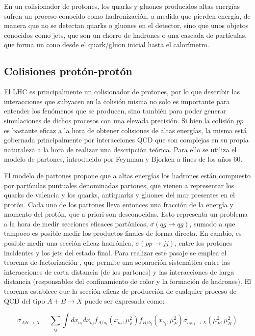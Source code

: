 En un colisionador de protones, los quarks y
gluones producidos altas energías sufren un proceso conocido como hadronización,
a medida que pierden energía, de manera que no se detectan quarks o gluones en el
detector, sino que unos objetos conocidos como jets, que son un chorro de hadrones
o una cascada de partículas, que forma un cono desde el quark/gluon inicial hasta el
calorímetro. 



\subsection{Colisiones protón-protón}

El LHC es principalmente un colisionador de protones, por lo que describir las interacciones que subyacen en la colisión misma no solo es importante para entender los fenómenos que se producen, sino también para poder generar simulaciones de dichos procesos con una elevada precisión. Si bien la colisión $pp$ es bastante eficaz a la hora de obtener colisiones de altas energías, la misma está gobernada principalmente por interacciones QCD que son complejas en su propia naturaleza a la hora de realizar una descripción teórica. Para ello se utiliza el modelo de partones, introducido por Feynman \cite{feynman} y Bjorken \cite{bjorken} a fines de los años 60. 

El modelo de partones propone que a altas energías los hadrones están compuesto por partículas puntuales denominadas partones, que vienen a representar los quarks de valencia y los quarks, antiquarks y gluones del mar presentes en el protón. Cada uno de los partones lleva entonces una fracción de la energía y momento del protón, que a priori son desconocidas. Esto representa un problema a la hora de medir secciones eficaces partónicas, $\sigma(qg\to qg)$, sumado a que tampoco es posible medir los productos finales de forma directa. En cambio, es posible medir una sección eficaz hadrónica, $\sigma(pp\to jj)$, entre los protones incidentes y los jets del estado final. Para realizar este pasaje se emplea el teorema de factorización \cite{ELLIS1978281}, que permite una separación sistemática
entre las interacciones de corta distancia (de los partones) y las interacciones de larga distancia (responsables del confinamiento de color y la formación de hadrones). El teorema establece que la sección eficaz de producción de cualquier proceso de QCD del tipo $A+B\to X$ puede ser expresada como:

\begin{equation}
	\label{eq:xs_fact}
	\sigma_{AB\to X} = \sum_{ij} \int dx_{a_i} dx_{b_j} f_{A/a_i}(x_{a_i}, \mu_{F}^2) f_{B/b_j}(x_{b_j}, \mu_{F}^2) \sigma_{a_i b_j \to X}(\mu_{F}^2, \mu_{R}^2)
\end{equation}
%

